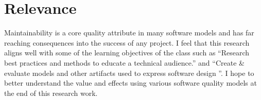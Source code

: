 \documentclass[dvips,12pt]{article}
\begin{document}
\section{Relevance}

Maintainability is a core quality attribute in many software models and has far reaching consequences into the success of any project. I feel that this research aligns well with some of the learning objectives of the class such as ``Research best practices and methods to educate a technical audience.'' and ``Create \& evaluate models and other artifacts used to express software design ''.
I hope to better understand the value and effects using various software quality models at the end of this research work. 

\nocite{dehaghani_which_2013}



\end{document}
